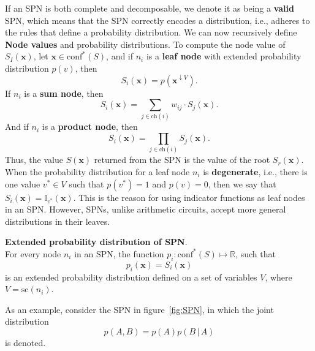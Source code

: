\documentclass{article}
\newcommand{\giv}{\,|\,}
\begin{document}
\noindent If an SPN is both complete and decomposable, we denote it as being a \textbf{valid} SPN, which means that the SPN correctly encodes a distribution, i.e., adheres to the rules that define a probability distribution. We can now recursively define \textbf{Node values} and probability distributions. To compute the node value of $S_I(\textbf{x})$, let $\textbf{x} \in \text{conf}^*(S)$, and if $n_i$ is a \textbf{leaf node} with extended probability distribution $p(v)$, then 
$$
    S_i(\textbf{x}) = p(\textbf{x}^{\downarrow V}).
$$
\noindent If $n_i$ is a \textbf{sum node}, then
$$
    S_i(\textbf{x}) = \sum_{j \in \text{ch}(i)} w_{ij} \cdot S_j(\textbf{x}).
$$
\noindent And if $n_i$ is a \textbf{product node}, then
$$
    S_i(\textbf{x}) = \prod_{j \in \text{ch}(i)} S_j(\textbf{x}).
$$
\noindent Thus, the value $S(\textbf{x})$ returned from the SPN is the value of the root $S_r(\textbf{x})$. When the probability distribution for a leaf node $n_i$ is \textbf{degenerate}, i.e., there is one value $v^* \in V$ such that $p(v^*) = 1$ and $p(v) = 0$, then we say that $S_i(\textbf{x}) = \mathbb{I}_{v^*}(\textbf{x})$. This is the reason for using indicator functions as leaf nodes in an SPN. However, SPNs, unlike arithmetic circuits, accept more general distributions in their leaves. 
\\
\begin{theorem}
    \textbf{Extended probability distribution of SPN}.\\
    For every node $n_i$ in an SPN, the function $p_i: \text{conf}^*(S) \mapsto \mathbb{R}$, such that 
    $$
        p_i(\mathbf{x}) = S_i(\mathbf{x})
    $$
    is an extended probability distribution defined on a set of variables $V$, where $V = \text{sc}(n_i)$. 
\end{theorem}

\noindent As an example, consider the SPN in figure~\ref{fig:SPN}, in which the joint distribution 
$$
    p(A, B) = p(A)p(B \giv A)
$$
\noindent is denoted. 
\end{document}
